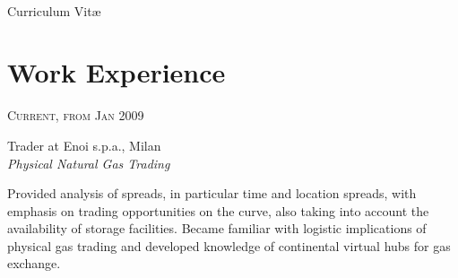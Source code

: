 \documentclass[10pt]{article} %
\begin{document}
\color{text1} %


\par{\\ %
{\color{headings} Curriculum {Vit\ae}\\[15pt]\par} %
	

\begin{minipage}[t]{0.5\textwidth} %
\vspace{0pt} %
	

\section{Work Experience} 


{\raggedleft\textsc{Current, from Jan 2009}\par}

{\raggedright\large Trader at Enoi s.p.a., Milan\\
\textit{Physical Natural Gas Trading}\\[5pt]}

\normalsize{Provided analysis of spreads, in particular time and location spreads, with emphasis on trading opportunities on the curve, also taking into account the availability of storage facilities. Became familiar with logistic implications of physical gas trading and developed knowledge of continental virtual hubs for gas exchange.}\\



\end{minipage}}
\end{document}
